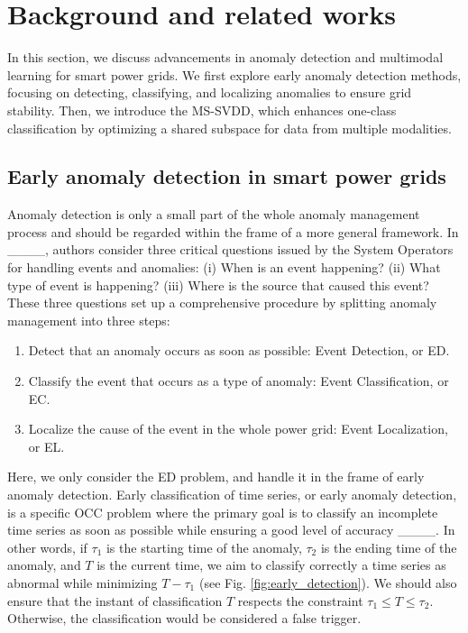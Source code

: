 \section{Background and related works}
In this section, we discuss advancements in anomaly detection and multimodal learning for smart power grids. We first explore early anomaly detection methods, focusing on detecting, classifying, and localizing anomalies to ensure grid stability. Then, we introduce the MS-SVDD, which enhances one-class classification by optimizing a shared subspace for data from multiple modalities.
\subsection{Early anomaly detection in smart power grids}
Anomaly detection is only a small part of the whole anomaly management process and should be regarded within the frame of a more general framework. In ____, authors consider three critical questions issued by the System Operators for handling events and anomalies: (i) When is an event happening? (ii) What type of event is happening? (iii) Where is the source that caused this event?  
These three questions set up a comprehensive procedure by splitting anomaly management into three steps:

\begin{enumerate}
    \item Detect that an anomaly occurs as soon as possible: Event Detection, or ED.
    \item Classify the event that occurs as a type of anomaly: Event Classification, or EC.
    \item Localize the cause of the event in the whole power grid: Event Localization, or EL.
\end{enumerate}
Here, we only consider the ED problem, and handle it in the frame of early anomaly detection. Early classification of time series, or early anomaly detection, is a specific OCC problem where the primary goal is to classify an incomplete time series as soon as possible while ensuring a good level of accuracy ____. In other words, if $\tau_1$ is the starting time of the anomaly, $\tau_2$ is the ending time of the anomaly, and $T$ is the current time, we aim to classify correctly a time series as abnormal while minimizing $T - \tau_1$ (see Fig. \ref{fig:early_detection}). We should also ensure that the instant of classification $T$ respects the constraint $\tau_1 \leq T \leq \tau_2$. Otherwise, the classification would be considered a false trigger.

